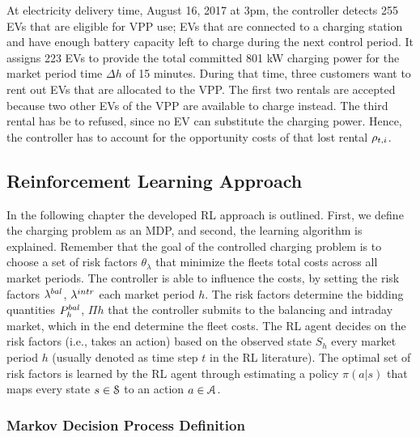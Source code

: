 \documentclass[a4paper, 12pt]{article}
\begin{document}
At electricity delivery time, August 16, 2017 at 3pm, the controller detects
255 EVs that are eligible for VPP use; EVs that are connected to a charging
station and have enough battery capacity left to charge during the next control
period. It assigns 223 EVs to provide the total committed 801 kW charging power
for the market period time \(\Delta h\) of 15 minutes. During that time, three
customers want to rent out EVs that are allocated to the VPP. The first two
rentals are accepted because two other EVs of the VPP are available to charge
instead. The third rental has be to refused, since no EV can substitute the
charging power. Hence, the controller has to account for the opportunity costs
of that lost rental \(\oc\).

\subsection{Reinforcement Learning Approach \label{sec-model-rl}}
\label{sec:orgf1480da}
In the following chapter the developed RL approach is outlined. First, we define
the charging problem as an MDP, and second, the learning algorithm is explained.
Remember that the goal of the controlled charging problem is to choose a set of
risk factors \(\theta_{\lambda}\) that minimize the fleets total costs across all
market periods. The controller is able to influence the costs, by setting the
risk factors \(\lb{}\), \(\li{}\) each market period \(h\). The risk factors determine
the bidding quantities \(\Pb{h}\), \(\Pi{h}\) that the controller submits to the
balancing and intraday market, which in the end determine the fleet costs. The
RL agent decides on the risk factors (i.e., takes an action) based on the
observed state \(S_{h}\) every market period \(h\) (usually denoted as time step \(t\)
in the RL literature). The optimal set of risk factors is learned by the RL
agent through estimating a policy \(\pi(a|s)\) that maps every state \(s\in\S\) to
an action \(a\in\A\).
\subsubsection{Markov Decision Process Definition}
\label{sec:org1dd732b}
\end{document}
